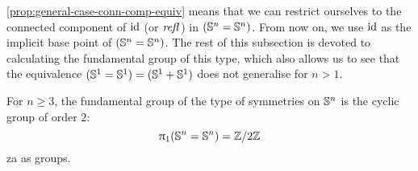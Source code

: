 \documentclass[english,a4]{article}
\begin{document}
\cref{prop:general-case-conn-comp-equiv} means that we can restrict ourselves to the connected component of $\mathord{\mathrm{id}}$ (or $\mathop{{\mathit{refl}}_{}}$) in $({\mathbb S^{n}} = {\mathbb S^{n}})$. From now on, we use $\mathord{\mathrm{id}}$ as the implicit base point of $({\mathbb S^{n}} = {\mathbb S^{n}})$.
The rest of this subsection is devoted to calculating the fundamental group of this type, which also allows us to see that the equivalence $({\mathbb S^{1}} = {\mathbb S^{1}}) = ({\mathbb S^{1}} + {\mathbb S^{1}})$ does not generalise for $n > 1$.


\begin{theorem} \label{thm:fund-grp-of-symmetries}
    For $n \geq 3$, the fundamental group of the type of symmetries on ${\mathbb S^{n}}$ is the cyclic group of order $2$:
    \begin{equation}
    \uppi_{1}({\mathbb S^{n}} = {\mathbb S^{n}}) = \mathbb{Z} \slash 2\mathbb{Z}
    \end{equation}za
    as groups.
\end{theorem}
\end{document}
